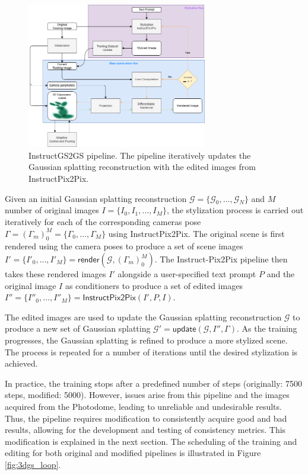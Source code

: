 \begin{figure}[!ht]
	\centering
	\includegraphics[width=0.7\textwidth]{Figures/methods/igs2gs.png}
	\caption{InstructGS2GS pipeline. The pipeline iteratively updates the Gaussian splatting reconstruction with the edited images from InstructPix2Pix.}
	\label{fig:instructgs2gs_pipeline}
\end{figure}

Given an initial Gaussian splatting reconstruction $\mathcal{G}  = \{ \mathcal{G} _0, \dots ,\mathcal{G}_N\}$ and $M$ number of original images $I = \{I_0, I_1, \dots, I_M\}$, the stylization process is carried out iteratively for each of the corresponding cameras pose $\varGamma  = (\varGamma _m)^M_0 = \{\varGamma _0 , \dots, \varGamma _M\}$ using InstructPix2Pix. The original scene is first rendered using the camera poses to produce a set of scene images $I' = \{I'_0, \dots, I'_M\} = \mathsf{render}(\mathcal{G}, (\varGamma _m)^M_0)$. The Instruct-Pix2Pix pipeline then takes these rendered images $I'$ alongside a user-specified text prompt $P$ and the original image $I$ as conditioners to produce a set of edited images $I'' = \{I''_0, \dots, I''_M\} = \mathsf{InstructPix2Pix}(I', P, I)$.

The edited images are used to update the Gaussian splatting reconstruction $\mathcal{G}$ to produce a new set of Gaussian splatting $\mathcal{G}' = \mathsf{update}(\mathcal{G}, I'', \varGamma)$. As the training progresses, the Gaussian splatting is refined to produce a more stylized scene. The process is repeated for a number of iterations until the desired stylization is achieved.

In practice, the training stops after a predefined number of steps (originally: 7500 steps, modified: 5000). However, issues arise from this pipeline and the images acquired from the Photodome, leading to unreliable and undesirable results. Thus, the pipeline requires modification to consistently acquire good and bad results, allowing for the development and testing of consistency metrics. This modification is explained in the next section. The scheduling of the training and editing for both original and modified pipelines is illustrated in Figure \ref{fig:3dgs_loop}.

